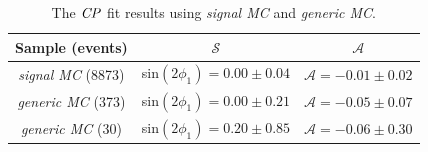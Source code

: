 \begin{table}
	\centering
	\caption{The $\it{CP}$ fit results using \textit{signal MC} and \textit{generic MC}.}
	\label{tab:cpfit_result_mc}
\begin{tabular}{|c|c|c|}
	\hline
	Sample (events)& $\mathcal{S}$ &  $\mathcal{A}$\\
	\hline
	\textit{signal MC} (8873) & sin$(2\phi_1) = 0.00 \pm 0.04 $ &  $\mathcal{A} = -0.01 \pm 0.02$\\
	\hline
	\textit{generic MC} (373) &  sin$(2\phi_1)  = 0.00 \pm 0.21$ & $\mathcal{A}  = -0.05 \pm 0.07$ \\
	\hline
	\textit{generic MC} (30) & sin$(2\phi_1) = 0.20 \pm 0.85 $& $\mathcal{A} = -0.06 \pm 0.30$ \\
	\hline
\end{tabular}
\end{table}

